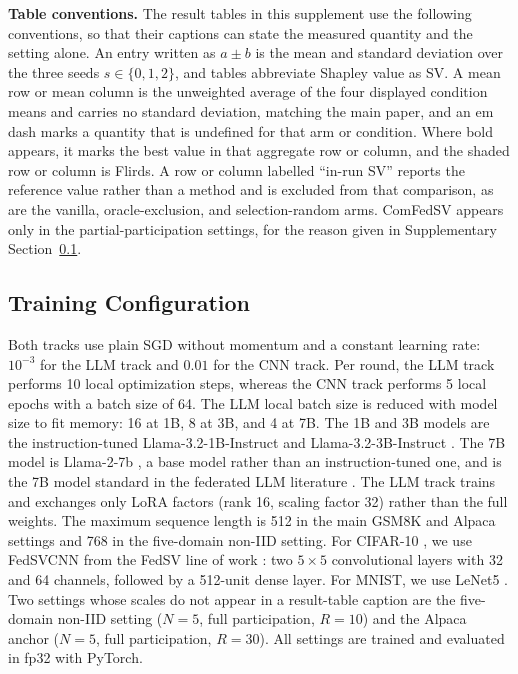 \documentclass[letterpaper]{article} %
\theoremstyle{plain}
\begin{document}
\textbf{Table conventions.} The result tables in this supplement use the
following conventions, so that their captions can state the measured quantity
and the setting alone. An entry written as $a \pm b$ is the mean and standard
deviation over the three seeds $s \in \{0, 1, 2\}$, and tables abbreviate
Shapley value as SV. A mean row or mean column is the unweighted average of
the four displayed condition means and carries no standard deviation, matching
the main paper, and an em dash marks a quantity that is undefined for that arm
or condition. Where bold appears, it marks the best
value in that aggregate row or column, and the shaded row or column is Flirds.
A row or column labelled ``in-run SV'' reports the reference value rather than
a method and is excluded from that comparison, as are the vanilla,
oracle-exclusion, and selection-random arms. ComFedSV appears only in the
partial-participation settings, for the reason given in Supplementary
Section~\ref{app:train}.

\subsection{Training Configuration}
\label{app:train}

Both tracks use plain SGD without momentum and a constant learning rate:
$10^{-3}$ for the LLM track and $0.01$ for the CNN track. Per round, the LLM
track performs 10 local optimization steps, whereas the CNN track performs 5
local epochs with a batch size of 64. The LLM local batch size is reduced with model size
to fit memory: 16 at 1B, 8 at 3B, and 4 at 7B. The 1B and 3B models are the
instruction-tuned Llama-3.2-1B-Instruct and Llama-3.2-3B-Instruct
\citep{grattafiori2024llama}. The 7B
model is Llama-2-7b \citep{touvron2023llama}, a base model rather than an
instruction-tuned one, and
is the 7B model standard in the federated LLM literature
\citep{ye2024openfedllm}. The LLM track trains and
exchanges only LoRA \citep{hu2022lora} factors (rank 16, scaling factor 32) rather than the full
weights. The maximum sequence length is 512 in the main GSM8K and Alpaca
settings and 768 in the five-domain non-IID setting.
For CIFAR-10 \citep{krizhevsky2009learning}, we use FedSVCNN from the FedSV
line of work \citep{wang2020principled}: two
$5{\times}5$ convolutional layers with 32 and 64 channels, followed by a
512-unit dense layer. For MNIST, we use LeNet5 \citep{lecun1998gradient}. Two settings whose scales do
not appear in a result-table caption are the five-domain non-IID setting
($N{=}5$, full participation, $R{=}10$) and the Alpaca anchor ($N{=}5$, full
participation, $R{=}30$). All settings are trained and evaluated in fp32 with
PyTorch.
\end{document}
